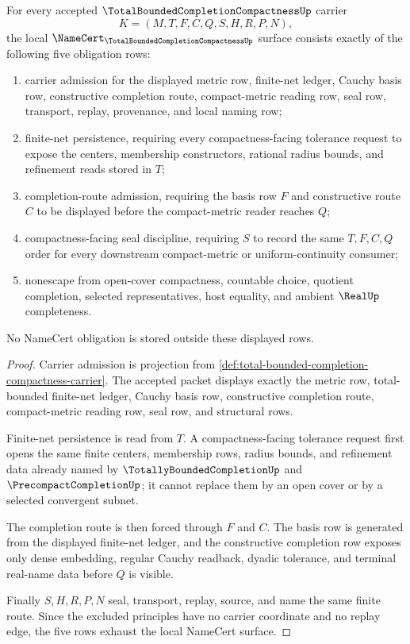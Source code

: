 \begin{theorem}
\label{thm:total-bounded-completion-compactness-namecert-obligations}
For every accepted $\TotalBoundedCompletionCompactnessUp$ carrier
$$
K=(M,T,F,C,Q,S,H,R,P,N),
$$
the local $\NameCert_{\TotalBoundedCompletionCompactnessUp}$ surface consists exactly of the following five obligation rows:
\begin{enumerate}
\item carrier admission for the displayed metric row, finite-net ledger, Cauchy basis row, constructive completion route, compact-metric reading row, seal row, transport, replay, provenance, and local naming row;
\item finite-net persistence, requiring every compactness-facing tolerance request to expose the centers, membership constructors, rational radius bounds, and refinement reads stored in $T$;
\item completion-route admission, requiring the basis row $F$ and constructive route $C$ to be displayed before the compact-metric reader reaches $Q$;
\item compactness-facing seal discipline, requiring $S$ to record the same $T,F,C,Q$ order for every downstream compact-metric or uniform-continuity consumer;
\item nonescape from open-cover compactness, countable choice, quotient completion, selected representatives, host equality, and ambient $\RealUp$ completeness.
\end{enumerate}
No NameCert obligation is stored outside these displayed rows.
\end{theorem}
\begin{proof}
Carrier admission is projection from \autoref{def:total-bounded-completion-compactness-carrier}. The accepted packet displays exactly the metric row, total-bounded finite-net ledger, Cauchy basis row, constructive completion route, compact-metric reading row, seal row, and structural rows.

Finite-net persistence is read from $T$. A compactness-facing tolerance request first opens the same finite centers, membership rows, radius bounds, and refinement data already named by $\TotallyBoundedCompletionUp$ and $\PrecompactCompletionUp$; it cannot replace them by an open cover or by a selected convergent subnet.

The completion route is then forced through $F$ and $C$. The basis row is generated from the displayed finite-net ledger, and the constructive completion row exposes only dense embedding, regular Cauchy readback, dyadic tolerance, and terminal real-name data before $Q$ is visible.

Finally $S,H,R,P,N$ seal, transport, replay, source, and name the same finite route. Since the excluded principles have no carrier coordinate and no replay edge, the five rows exhaust the local NameCert surface.
\end{proof}

